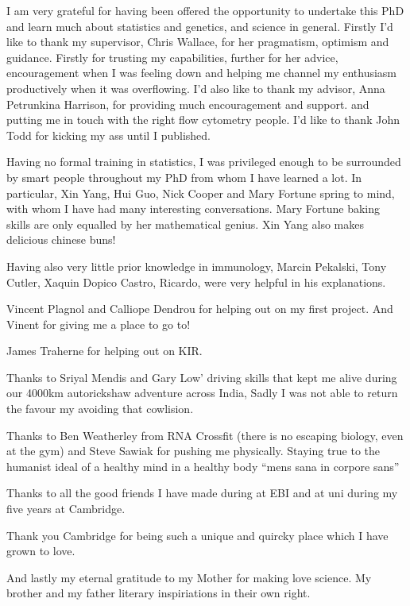 
\begin{acknowledgements}      

I am very grateful for having been offered the opportunity to undertake this PhD and learn much about statistics and genetics,
and science in general.
Firstly I'd like to thank my supervisor, Chris Wallace, for her pragmatism, optimism and guidance.
Firstly for trusting my capabilities,
further for her advice, encouragement when I was feeling down and helping me channel
my enthusiasm productively when it was overflowing.
I'd also like to thank my advisor, Anna Petrunkina Harrison, for providing much encouragement and support.
and putting me in touch with the right flow cytometry people.
I'd like to thank John Todd for kicking my ass until I published.

Having no formal training in statistics,
I was privileged enough to be surrounded by smart people throughout my PhD from whom I have learned a lot.
In particular, Xin Yang, Hui Guo, Nick Cooper and Mary Fortune spring to mind, with whom I have had many interesting conversations.
Mary Fortune baking skills are only equalled by her mathematical genius.
Xin Yang also makes delicious chinese buns!

Having also very little prior knowledge in immunology, Marcin Pekalski, Tony Cutler, Xaquin Dopico Castro, Ricardo, were very helpful in his explanations.

Vincent Plagnol and Calliope Dendrou for helping out on my first project.
And Vinent for giving me a place to go to!

James Traherne for helping out on KIR.

Thanks to Sriyal Mendis and Gary Low' driving skills that kept me alive during our 4000km autorickshaw adventure across India,
Sadly I was not able to return the favour my avoiding that cowlision.

Thanks to Ben Weatherley from RNA Crossfit (there is no escaping biology, even at the gym) and Steve Sawiak for pushing me physically.
Staying true to the humanist ideal of a healthy mind in a healthy body ``mens sana in corpore sans''

Thanks to all the good friends I have made during at EBI and at uni during my five years at Cambridge.

Thank you Cambridge for being such a unique and quircky place which I have grown to love.

And lastly my eternal gratitude to my Mother for making love science.
My brother and my father literary inspiriations in their own right.


\end{acknowledgements}
